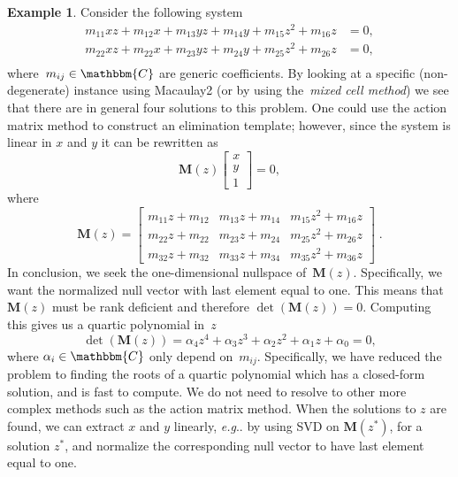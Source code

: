 \documentclass[11pt,a4paper]{article}
\makeatletter
\theoremstyle{definition}
\newtheorem{example}{Example}
\newcommand{\mat}[1]{\bm{#1}}
\newcommand{\C}{\ensuremath{\mathbbm{C}}}
\DeclareRobustCommand\eg{\emph{e.g}\@ifnextchar.{}{.\@}}
\makeatother
\begin{document}
\begin{example}\label{ex:hidden2}
Consider the following system
\begin{equation}
\begin{aligned}
m_{11}xz + m_{12}x + m_{13}yz + m_{14}y + m_{15}z^2 + m_{16}z &= 0, \\
m_{22}xz + m_{22}x + m_{23}yz + m_{24}y + m_{25}z^2 + m_{26}z &= 0, \\
\end{aligned}
\end{equation}
where~$m_{ij}\in\C$ are generic coefficients.
By looking at a specific (non-degenerate) instance using Macaulay2
(or by using the~\emph{mixed cell method}) we see that there are in
general four solutions to this problem. One could use the action matrix method to construct an
elimination template; however, since the system is linear in $x$ and $y$ it can be rewritten as
\begin{equation}\label{eq:specialnullvector}
\mat{M}(z)
\begin{bmatrix}
x \\
y \\
1
\end{bmatrix}
= 0,
\end{equation}
where
\begin{equation}
\mat{M}(z)=
\begin{bmatrix}
    m_{11}z + m_{12} & m_{13}z + m_{14} & m_{15}z^2 + m_{16}z \\
    m_{22}z + m_{22} & m_{23}z + m_{24} & m_{25}z^2 + m_{26}z \\
    m_{32}z + m_{32} & m_{33}z + m_{34} & m_{35}z^2 + m_{36}z
\end{bmatrix}\;.
\end{equation}
In conclusion, we seek the one-dimensional nullspace of~$\mat{M}(z)$. Specifically, we want
the normalized null vector with last element equal to one. This means that $\mat{M}(z)$ must
be rank deficient and therefore $\det(\mat{M}(z))=0$. Computing this gives us a
quartic polynomial in~$z$
\begin{equation}
    \det(\mat{M}(z)) =
    \alpha_4 z^4 +
    \alpha_3 z^3 +
    \alpha_2 z^2 +
    \alpha_1 z +
    \alpha_0 = 0,
\end{equation}
where $\alpha_i\in\C$ only depend on~$m_{ij}$. Specifically, we have reduced the problem to
finding the roots of a quartic polynomial which has a closed-form solution, and is fast to compute.
We do not need to resolve to other more complex methods such as the action matrix method.
When the solutions to $z$ are found, we can extract $x$ and $y$ linearly, \eg{} by using SVD
on $\mat{M}(z^*)$, for a solution $z^*$, and normalize the corresponding null vector to have
last element equal to one.
\end{example}
\end{document}
